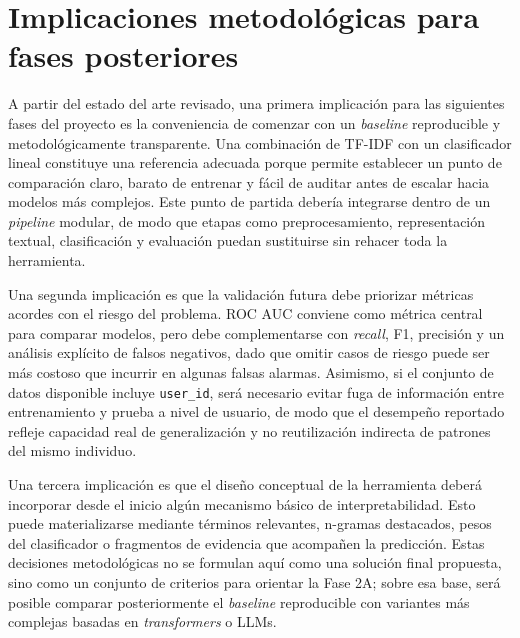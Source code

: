 \section{Implicaciones metodológicas para fases posteriores}

A partir del estado del arte revisado, una primera implicación para las siguientes fases del proyecto es la conveniencia de comenzar con un \textit{baseline} reproducible y metodológicamente transparente. Una combinación de TF-IDF con un clasificador lineal constituye una referencia adecuada porque permite establecer un punto de comparación claro, barato de entrenar y fácil de auditar antes de escalar hacia modelos más complejos. Este punto de partida debería integrarse dentro de un \textit{pipeline} modular, de modo que etapas como preprocesamiento, representación textual, clasificación y evaluación puedan sustituirse sin rehacer toda la herramienta.

Una segunda implicación es que la validación futura debe priorizar métricas acordes con el riesgo del problema. ROC AUC conviene como métrica central para comparar modelos, pero debe complementarse con \textit{recall}, F1, precisión y un análisis explícito de falsos negativos, dado que omitir casos de riesgo puede ser más costoso que incurrir en algunas falsas alarmas. Asimismo, si el conjunto de datos disponible incluye \texttt{user\_id}, será necesario evitar fuga de información entre entrenamiento y prueba a nivel de usuario, de modo que el desempeño reportado refleje capacidad real de generalización y no reutilización indirecta de patrones del mismo individuo.

Una tercera implicación es que el diseño conceptual de la herramienta deberá incorporar desde el inicio algún mecanismo básico de interpretabilidad. Esto puede materializarse mediante términos relevantes, n-gramas destacados, pesos del clasificador o fragmentos de evidencia que acompañen la predicción. Estas decisiones metodológicas no se formulan aquí como una solución final propuesta, sino como un conjunto de criterios para orientar la Fase 2A; sobre esa base, será posible comparar posteriormente el \textit{baseline} reproducible con variantes más complejas basadas en \textit{transformers} o LLMs.
